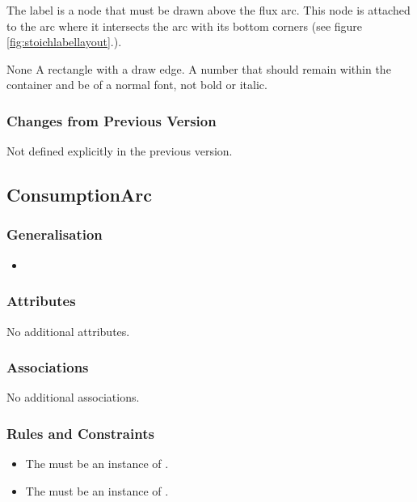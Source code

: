 The label is a node that must be drawn above the flux arc. This node
is attached to the arc where it intersects the arc with its bottom
corners (see figure \ref{fig:stoichlabellayout}.).

\begin{glyphDescription}
\glyphSboTerm None
\glyphContainer A rectangle with a draw edge.
\glyphLabel A number that should remain within the container and be of
a normal font, \ie not bold or italic.
\end{glyphDescription}


\subsubsection{Changes from Previous Version}

Not defined explicitly in the previous version.

\subsection{ConsumptionArc}

\subsubsection{Generalisation}

\begin{itemize}
\item {}
\end{itemize}

\subsubsection{Attributes}

No additional attributes.

\subsubsection{Associations}

No additional associations.

\subsubsection{Rules and Constraints}

\begin{itemize}
\item The  must be an instance of
  .
\item The  must be an instance of .
\end{itemize}

